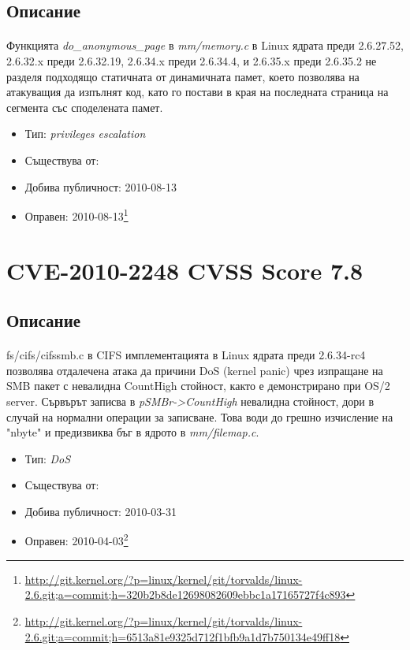 \documentclass[a4paper,12pt,leqno]{article}
\begin{document}
\subsection{Описание}
\paragraph{}
Функцията \textit{do\_anonymous\_page} в \textit{mm/memory.c} в Linux ядрата преди 2.6.27.52, 2.6.32.x преди 2.6.32.19, 2.6.34.x преди 2.6.34.4, и 2.6.35.x преди 2.6.35.2 не разделя подходящо статичната от динамичната памет, което позволява на атакуващия да изпълнят код, като го постави в края на последната страница на сегмента със споделената памет.

\begin{itemize}
    \item Тип: \textit{privileges escalation}
    \item Съществува от:
  	\item Добива публичност: 2010-08-13
    \item Оправен: 2010-08-13\footnote{\url{http://git.kernel.org/?p=linux/kernel/git/torvalds/linux-2.6.git;a=commit;h=320b2b8de12698082609ebbc1a17165727f4c893}}
\end{itemize}

\section{CVE-2010-2248 CVSS Score 7.8}
\subsection{Описание}
\paragraph{}
fs/cifs/cifssmb.c в CIFS имплементацията в Linux ядрата преди 2.6.34-rc4 позволява отдалечена атака да причини DoS (kernel panic) чрез изпращане на SMB пакет с невалидна CountHigh стойност, както е демонстрирано при OS/2 server. Сървърът записва в \textit{pSMBr->CountHigh} невалидна стойност, дори в случай на нормални операции за записване. Това води до грешно изчисление на "nbyte" и предизвиква бъг в ядрото в \textit{mm/filemap.c}.


\begin{itemize}
    \item Тип: \textit{DoS}
    \item Съществува от:
  	\item Добива публичност: 2010-03-31
    \item Оправен: 2010-04-03\footnote{\url{http://git.kernel.org/?p=linux/kernel/git/torvalds/linux-2.6.git;a=commit;h=6513a81e9325d712f1bfb9a1d7b750134e49ff18}}
\end{itemize}
\end{document}
